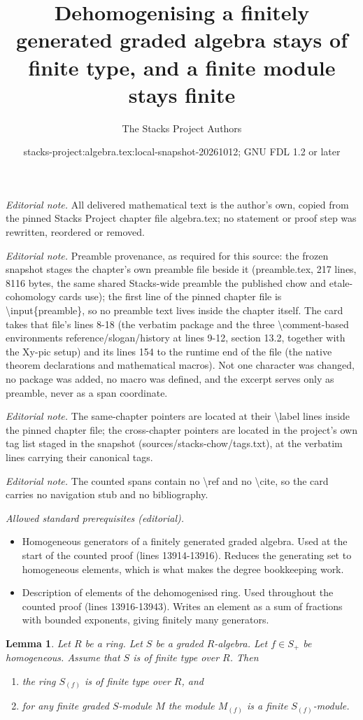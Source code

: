 \documentclass[10pt,a4paper]{amsart}
\title{Dehomogenising a finitely generated graded algebra stays of finite type, and a finite module stays finite}
\author{The Stacks Project Authors}
\date{stacks-project:algebra.tex:local-snapshot-20261012; GNU FDL 1.2 or later}
\theoremstyle{plain}
\newtheorem{lemma}[subsection]{Lemma}
\theoremstyle{definition}
\theoremstyle{remark}
\numberwithin{equation}{subsection}
\begin{document}
\maketitle
\noindent\textit{Editorial note.} All delivered mathematical text is the author's own, copied from the pinned Stacks Project chapter file algebra.tex; no statement or proof step was rewritten, reordered or removed.\par\medskip
\noindent\textit{Editorial note.} Preamble provenance, as required for this source: the frozen snapshot stages the chapter's own preamble file beside it (preamble.tex, 217 lines, 8116 bytes, the same shared Stacks-wide preamble the published chow and etale-cohomology cards use); the first line of the pinned chapter file is \textbackslash{}input\{preamble\}, so no preamble text lives inside the chapter itself. The card takes that file's lines 8-18 (the verbatim package and the three \textbackslash{}comment-based environments reference/slogan/history at lines 9-12, section 13.2, together with the Xy-pic setup) and its lines 154 to the runtime end of the file (the native theorem declarations and mathematical macros). Not one character was changed, no package was added, no macro was defined, and the excerpt serves only as preamble, never as a span coordinate.\par\medskip
\noindent\textit{Editorial note.} The same-chapter pointers are located at their \textbackslash{}label lines inside the pinned chapter file; the cross-chapter pointers are located in the project's own tag list staged in the snapshot (sources/stacks-chow/tags.txt), at the verbatim lines carrying their canonical tags.\par\medskip
\noindent\textit{Editorial note.} The counted spans contain no \textbackslash{}ref and no \textbackslash{}cite, so the card carries no navigation stub and no bibliography.\par\medskip
\noindent\textit{Allowed standard prerequisites (editorial).}\begin{itemize}
\item Homogeneous generators of a finitely generated graded algebra. Used at the start of the counted proof (lines 13914-13916). Reduces the generating set to homogeneous elements, which is what makes the degree bookkeeping work.
\item Description of elements of the dehomogenised ring. Used throughout the counted proof (lines 13916-13943). Writes an element as a sum of fractions with bounded exponents, giving finitely many generators.
\end{itemize}\medskip
\begin{lemma}
\label{lemma-dehomogenize-finite-type}
Let $R$ be a ring. Let $S$ be a graded $R$-algebra. Let $f \in S_{+}$
be homogeneous. Assume that $S$ is of finite type over $R$. Then
\begin{enumerate}
\item the ring $S_{(f)}$ is of finite type over $R$, and
\item for any finite graded $S$-module $M$ the module $M_{(f)}$
is a finite $S_{(f)}$-module.
\end{enumerate}
\end{lemma}
\end{document}
